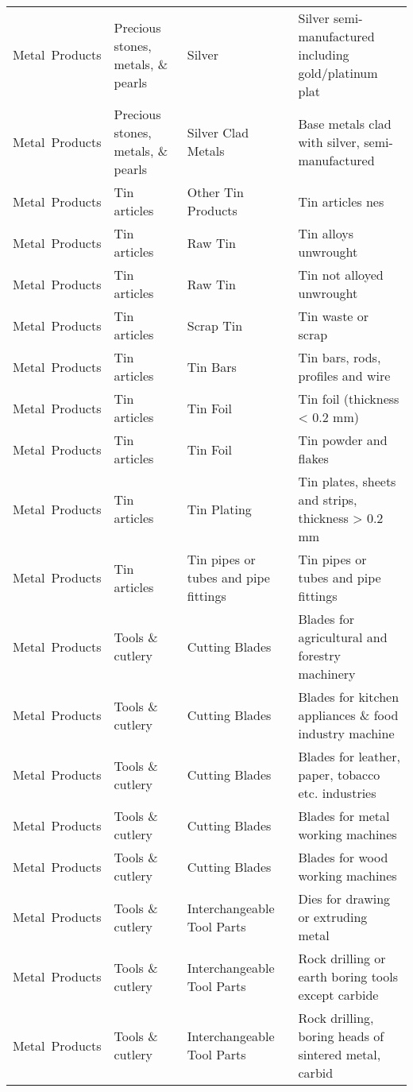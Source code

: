 \begin{appendices}
\begin{xltabular}{\textwidth}{|p{0.10\textwidth}|p{0.25\textwidth}|p{0.20\textwidth}|p{0.35\textwidth}|}
		Metal\ Products & Precious stones, metals, \& pearls & Silver & Silver semi-manufactured including gold/platinum plat \\
		Metal\ Products & Precious stones, metals, \& pearls & Silver Clad Metals & Base metals clad with silver, semi-manufactured \\
		Metal\ Products & Tin articles & Other Tin Products & Tin articles nes \\
		Metal\ Products & Tin articles & Raw Tin & Tin alloys unwrought \\
		Metal\ Products & Tin articles & Raw Tin & Tin not alloyed unwrought \\
		Metal\ Products & Tin articles & Scrap Tin & Tin waste or scrap \\
		Metal\ Products & Tin articles & Tin Bars & Tin bars, rods, profiles and wire \\
		Metal\ Products & Tin articles & Tin Foil & Tin foil (thickness < 0.2 mm) \\
		Metal\ Products & Tin articles & Tin Foil & Tin powder and flakes \\
		Metal\ Products & Tin articles & Tin Plating & Tin plates, sheets and strips, thickness > 0.2 mm \\
		Metal\ Products & Tin articles & Tin pipes or tubes and pipe fittings & Tin pipes or tubes and pipe fittings \\
		Metal\ Products & Tools \& cutlery & Cutting Blades & Blades for agricultural and forestry machinery \\
		Metal\ Products & Tools \& cutlery & Cutting Blades & Blades for kitchen appliances \& food industry machine \\
		Metal\ Products & Tools \& cutlery & Cutting Blades & Blades for leather, paper, tobacco etc. industries \\
		Metal\ Products & Tools \& cutlery & Cutting Blades & Blades for metal working machines \\
		Metal\ Products & Tools \& cutlery & Cutting Blades & Blades for wood working machines \\
		Metal\ Products & Tools \& cutlery & Interchangeable Tool Parts & Dies for drawing or extruding metal \\
		Metal\ Products & Tools \& cutlery & Interchangeable Tool Parts & Rock drilling or earth boring tools except carbide \\
		Metal\ Products & Tools \& cutlery & Interchangeable Tool Parts & Rock drilling, boring heads of sintered metal, carbid \\

\end{xltabular}
\end{appendices}
